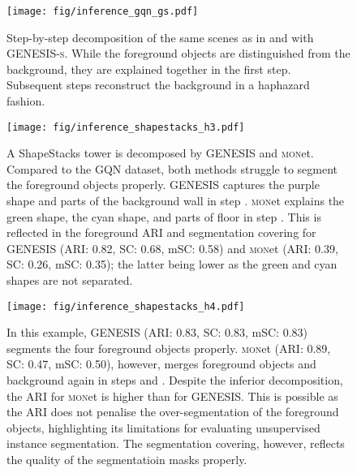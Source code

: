 \documentclass{article}
\begin{document}
\begin{figure}[h]
    \centering
    \texttt{[image: fig/inference\_gqn\_gs.pdf]}
    \caption{Step-by-step decomposition of the same scenes as in  and  with \mbox{\gls{GENESIS}\textsc{-s}}. While the foreground objects are distinguished from the background, they are explained together in the first step. Subsequent steps reconstruct the background in a haphazard fashion.}
    \label{fig:inference_gqn_gs}
\end{figure}

\begin{figure}[h]
    \centering
    \texttt{[image: fig/inference\_shapestacks\_h3.pdf]}
    \caption{A ShapeStacks tower is decomposed by \gls{GENESIS} and \textsc{mon}et.
    Compared to the GQN dataset, both methods struggle to segment the foreground objects properly. \gls{GENESIS} captures the purple shape and parts of the background wall in step . \textsc{mon}et explains the green shape, the cyan shape, and parts of floor in step .
    This is reflected in the foreground ARI and segmentation covering for \gls{GENESIS} (ARI: 0.82, SC: 0.68, mSC: 0.58) and \textsc{mon}et (ARI: 0.39, SC: 0.26, mSC: 0.35); the latter being lower as the green and cyan shapes are not separated.}
    \label{fig:decomposition_shapestacks_h3}
\end{figure}

\begin{figure}[h]
    \centering
    \texttt{[image: fig/inference\_shapestacks\_h4.pdf]}
    \caption{In this example, \gls{GENESIS} (ARI: 0.83, SC: 0.83, mSC: 0.83) segments the four foreground objects properly.
    \textsc{mon}et (ARI: 0.89, SC: 0.47, mSC: 0.50), however, merges foreground objects and background again in steps  and .
    Despite the inferior decomposition, the ARI for \textsc{mon}et is higher than for \mbox{\gls{GENESIS}}. This is possible as the ARI does not penalise the over-segmentation of the foreground objects, highlighting its limitations for evaluating unsupervised instance segmentation. The segmentation covering, however, reflects the quality of the segmentatioin masks properly.}
    \label{fig:decomposition_shapestacks_h4}
\end{figure}






















 
\end{document}
